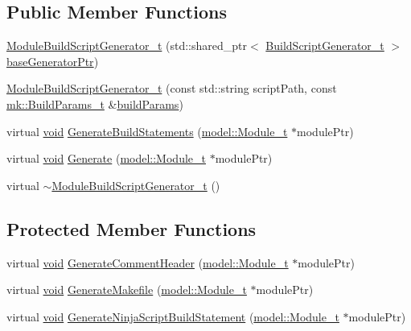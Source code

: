\subsection*{Public Member Functions}
\begin{DoxyCompactItemize}
\item 
\hyperlink{classninja_1_1_module_build_script_generator__t_a0bef5512f8b6da1b6d59786ba79f2c64}{Module\+Build\+Script\+Generator\+\_\+t} (std\+::shared\+\_\+ptr$<$ \hyperlink{classninja_1_1_build_script_generator__t}{Build\+Script\+Generator\+\_\+t} $>$ \hyperlink{structninja_1_1_require_base_generator__t_a3a16080268acf0b71c18eed619429f6a}{base\+Generator\+Ptr})
\item 
\hyperlink{classninja_1_1_module_build_script_generator__t_a1a9b7a66b8f35240ea7b0b8ae23ce200}{Module\+Build\+Script\+Generator\+\_\+t} (const std\+::string script\+Path, const \hyperlink{structmk_1_1_build_params__t}{mk\+::\+Build\+Params\+\_\+t} \&\hyperlink{structninja_1_1_require_base_generator__t_a78d7cecd653f49f8ad74fdbb65343705}{build\+Params})
\item 
virtual \hyperlink{_t_e_m_p_l_a_t_e__cdef_8h_ac9c84fa68bbad002983e35ce3663c686}{void} \hyperlink{classninja_1_1_module_build_script_generator__t_ae85e086271710481430b0fa09e84755f}{Generate\+Build\+Statements} (\hyperlink{structmodel_1_1_module__t}{model\+::\+Module\+\_\+t} $\ast$module\+Ptr)
\item 
virtual \hyperlink{_t_e_m_p_l_a_t_e__cdef_8h_ac9c84fa68bbad002983e35ce3663c686}{void} \hyperlink{classninja_1_1_module_build_script_generator__t_a5b84a33a52b8ab7212f2fac8f4b2d772}{Generate} (\hyperlink{structmodel_1_1_module__t}{model\+::\+Module\+\_\+t} $\ast$module\+Ptr)
\item 
virtual \hyperlink{classninja_1_1_module_build_script_generator__t_ac5b2edc9f2b736dda430581e4bdda311}{$\sim$\+Module\+Build\+Script\+Generator\+\_\+t} ()
\end{DoxyCompactItemize}
\subsection*{Protected Member Functions}
\begin{DoxyCompactItemize}
\item 
virtual \hyperlink{_t_e_m_p_l_a_t_e__cdef_8h_ac9c84fa68bbad002983e35ce3663c686}{void} \hyperlink{classninja_1_1_module_build_script_generator__t_aff52d29032fb73ed3c5ea1a74dc3f9a1}{Generate\+Comment\+Header} (\hyperlink{structmodel_1_1_module__t}{model\+::\+Module\+\_\+t} $\ast$module\+Ptr)
\item 
virtual \hyperlink{_t_e_m_p_l_a_t_e__cdef_8h_ac9c84fa68bbad002983e35ce3663c686}{void} \hyperlink{classninja_1_1_module_build_script_generator__t_a8fc392059dbdd07b6d90629ffce65b47}{Generate\+Makefile} (\hyperlink{structmodel_1_1_module__t}{model\+::\+Module\+\_\+t} $\ast$module\+Ptr)
\item 
virtual \hyperlink{_t_e_m_p_l_a_t_e__cdef_8h_ac9c84fa68bbad002983e35ce3663c686}{void} \hyperlink{classninja_1_1_module_build_script_generator__t_aced52484e461ee00d7755384e963b6f9}{Generate\+Ninja\+Script\+Build\+Statement} (\hyperlink{structmodel_1_1_module__t}{model\+::\+Module\+\_\+t} $\ast$module\+Ptr)
\end{DoxyCompactItemize}
